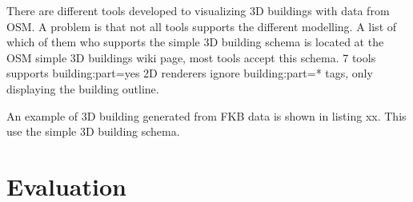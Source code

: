 There are different tools developed to visualizing 3D buildings with data from OSM. A problem is that not all tools supports the different modelling. A list of which of them who supports the simple 3D building schema is located at the OSM simple 3D buildings wiki page, most tools accept this schema. 7 tools supports building:part=yes %
2D renderers ignore building:part=* tags, only displaying the building outline. 

An example of 3D building generated from FKB data is shown in listing xx. This use the simple 3D building schema. 

\section{Evaluation}

